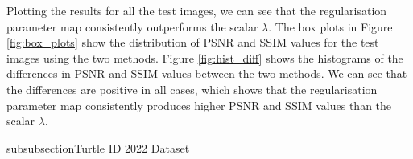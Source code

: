 \documentclass[12pt]{article}
\begin{document}
Plotting the results for all the test images, we can see that the regularisation parameter map consistently outperforms the scalar $\lambda$.
The box plots in Figure 
\ref{fig:box_plots} 
show the distribution of PSNR and SSIM \cite{ssim} values for the test images
using the two methods.
Figure 
\ref{fig:hist_diff}
shows the histograms of the differences in PSNR and SSIM values between the two methods.
We can see that the differences are positive in all cases, which shows that the regularisation parameter map consistently produces higher PSNR and SSIM values than the scalar $\lambda$.














subsubsection{Turtle ID 2022 Dataset}
\end{document}
